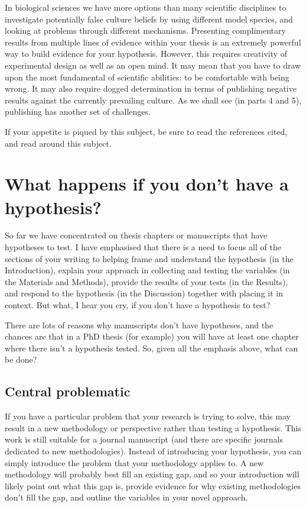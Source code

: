 \documentclass[
]{krantz}
\begin{document}
In biological sciences we have more options than many scientific disciplines to investigate potentially false culture beliefs by using different model species, and looking at problems through different mechanisms. Presenting complimentary results from multiple lines of evidence within your thesis is an extremely powerful way to build evidence for your hypothesis. However, this requires creativity of experimental design as well as an open mind. It may mean that you have to draw upon the most fundamental of scientific abilities: to be comfortable with being wrong. It may also require dogged determination in terms of publishing negative results against the currently prevailing culture. As we shall see (in parts 4 and 5), publishing has another set of challenges.

If your appetite is piqued by this subject, be sure to read the references cited, and read around this subject.

\hypertarget{nohypothesis}{%
\section{What happens if you don't have a hypothesis?}\label{nohypothesis}}

So far we have concentrated on thesis chapters or manuscripts that have hypotheses to test. I have emphasised that there is a need to focus all of the sections of your writing to helping frame and understand the hypothesis (in the Introduction), explain your approach in collecting and testing the variables (in the Materials and Methods), provide the results of your tests (in the Results), and respond to the hypothesis (in the Discussion) together with placing it in context. But what, I hear you cry, if you don't have a hypothesis to test?

There are lots of reasons why manuscripts don't have hypotheses, and the chances are that in a PhD thesis (for example) you will have at least one chapter where there isn't a hypothesis tested. So, given all the emphasis above, what can be done?

\hypertarget{central-problematic}{%
\subsection{Central problematic}\label{central-problematic}}

If you have a particular problem that your research is trying to solve, this may result in a new methodology or perspective rather than testing a hypothesis. This work is still suitable for a journal manuscript (and there are specific journals dedicated to new methodologies). Instead of introducing your hypothesis, you can simply introduce the problem that your methodology applies to. A new methodology will probably best fill an existing gap, and so your introduction will likely point out what this gap is, provide evidence for why existing methodologies don't fill the gap, and outline the variables in your novel approach.
\end{document}

